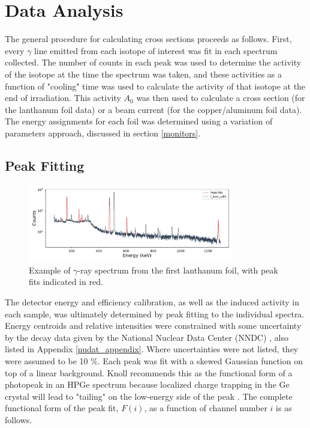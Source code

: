 \documentclass[aps,twocolumn,secnumarabic,balancelastpage,amsmath,amssymb,nofootinbib,floatfix]{revtex4-1}
\begin{document}
\section{Data Analysis}
The general procedure for calculating cross sections proceeds as follows.  First, every $\gamma$ line emitted from each isotope of interest was fit in each spectrum collected.  The number of counts in each peak was used to determine the activity of the isotope at the time the spectrum was taken, and these activities as a function of "cooling" time was used to calculate the activity of that isotope at the end of irradiation.  This activity $A_0$ was then used to calculate a cross section (for the lanthanum foil data) or a beam current (for the copper/aluminum foil data).  The energy assignments for each foil was determined using a variation of parameters approach, discussed in section \ref{monitors}.

\subsection{Peak Fitting}

\begin{figure}[htb]
\includegraphics[width=9cm]{peak_fits/I_1cm_La01_fits}
\caption{Example of $\gamma$-ray spectrum from the first lanthanum foil, with peak fits indicated in red.
}
\label{fig:peak_fit}
\end{figure}

The detector energy and efficiency calibration, as well as the induced activity in each sample, was ultimately determined by peak fitting to the individual spectra.  Energy centroids and relative intensities were constrained with some uncertainty by the decay data given by the National Nuclear Data Center (NNDC) \cite{ensdf}, also listed in Appendix \ref{nudat_appendix}.  Where uncertainties were not listed, they were assumed to be 10 \%.  Each peak was fit with a skewed Gaussian function on top of a linear background. Knoll recommends this as the functional form of a photopeak in an HPGe spectrum because localized charge trapping in the Ge crystal will lead to "tailing" on the low-energy side of the peak \cite{Knoll}.  The complete functional form of the peak fit, $F(i)$, as a function of channel number $i$ is as follows.
\end{document}
